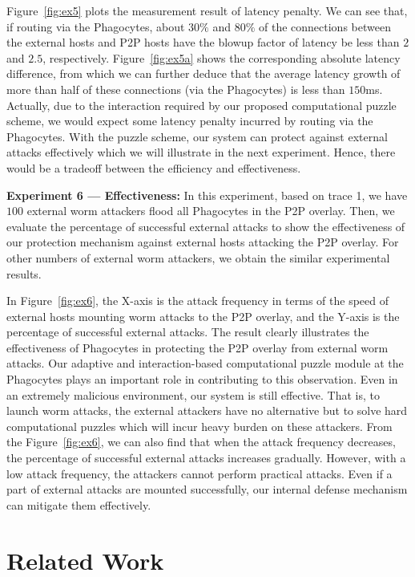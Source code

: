 \documentclass[times,10pt,twocolumn]{article}
\begin{document}
Figure~\ref{fig:ex5} plots the measurement result of latency
penalty. We can see that, if routing via the Phagocytes, about
$30\%$ and $80\%$ of the connections between the external hosts and
P2P hosts have the blowup factor of latency be less than $2$ and
$2.5$, respectively. Figure~\ref{fig:ex5a} shows the corresponding
absolute latency difference, from which we can further deduce that
the average latency growth of more than half of these connections
(via the Phagocytes) is less than $150$ms. Actually, due to the
interaction required by our proposed computational puzzle scheme, we
would expect some latency penalty incurred by routing via the
Phagocytes. With the puzzle scheme, our system can protect against
external attacks effectively which we will illustrate in the next
experiment. Hence, there would be a tradeoff between the efficiency
and effectiveness.



\textbf{Experiment 6 --- Effectiveness:} In this experiment, based
on trace 1, we have $100$ external worm attackers flood all
Phagocytes in the P2P overlay. Then, we evaluate the percentage of
successful external attacks to show the effectiveness of our
protection mechanism against external hosts attacking the P2P
overlay. For other numbers of external worm attackers, we obtain the
similar experimental results.


In Figure~\ref{fig:ex6}, the X-axis is the attack frequency in terms
of the speed of external hosts mounting worm attacks to the P2P
overlay, and the Y-axis is the percentage of successful external
attacks. The result clearly illustrates the effectiveness of
Phagocytes in protecting the P2P overlay from external worm attacks.
Our adaptive and interaction-based computational puzzle module at
the Phagocytes plays an important role in contributing to this
observation. Even in an extremely malicious environment, our system
is still effective. That is, to launch worm attacks, the external
attackers have no alternative but to solve hard computational
puzzles which will incur heavy burden on these attackers. From the
Figure~\ref{fig:ex6}, we can also find that when the attack
frequency decreases, the percentage of successful external attacks
increases gradually. However, with a low attack frequency, the
attackers cannot perform practical attacks. Even if a part of
external attacks are mounted successfully, our internal defense
mechanism can mitigate them effectively.




\section{Related Work}
\label{sec:RelatedWork}
\end{document}
